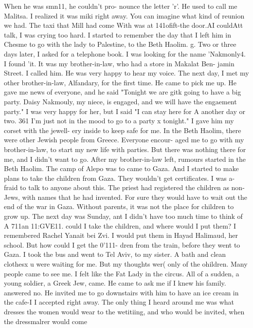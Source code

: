 When he was smn11, he couldn't pro-
nounce the letter 'r'.
He used to call me Malitsa.
I realized it was miki right away.
You can imagine what kind of reunion we had.
The taxi that Mill had come With was at 
141ofift-the 
door.AI couldAtt talk, I was crying too hard.
I started to remember the day that 
I left him in Chesme to go with the lady to Palestine, to the Beth Haolim.
g. 
Two or three days later, I asked for a telephone book.
I was looking for the name 
'Nakmonly4.
I found 'it.
It was my brother-in-law, who had a store in Makalat Ben-
jamin Street.
I called him.
He was very happy to hear my voice.
The next day, I met 
my other brother-in-law, Alfandary, for the first time.
He came to pick me up.
He 
gave me news of everyone, and he said "Tonight we are gitk going to have a big party.
Daisy Nakmouly, my niece, is engaged, and we will have the engaement party."
I was 
very happy for her, but I said "I can stay here for A another day or two.
361 I'm 
just not in the mood to go to a party x tonight."
I gave him my corset with the jewell-
ery inside to keep safe for me.
In the Beth Haolim, there were other Jewish people from Greece.
Everyone encour-
aged me to go with my brother-in-law, to start my new life with parties.
But there was 
nothing there for me, and I didn't want to go.
After my brother-in-law left, rumours 
started in the Beth Haolim.
The camp of Alepo was to came to Gaza.
And I started to 
make plans to take the children from Gaza.
They wouldn't get certificates.
I was a-
fraid to talk to anyone about this.
The priest had registered the children as non-Jews, 
with names that he had invented.
For sure they would have to wait out the end of the 
war in Gaza.
Without parents, it was not the place for children to grow up.
The next day was Sunday, ant I didn't have too much time to think of A 711an 11:GVE11.
could I take the children, and where would I put them?
I remembered Rachel Yanait bei 
Zvi.
I would put them in Hayad Halimaud, her school.
But how could I get the 0'111- 
dren from the train, before they went to Gaza.
I took the bus and went to Tel Aviv, 
to my sister.
A bath and clean clothesx u were waiting for me.
But my thoughts wer( 
only of the ohildren.
Many people came to see me.
I felt like the Fat Lady in the circus.
All of a 
sudden, a young soldier, a Greek Jew, came.
He came to ask me if I knew his family.
answered no.
He invited me to go downstairs with him to have an ice cream in the cafe-I 
I accepted right away.
The only thing I heard around me was what dresses the women 
would wear to the wetitiing, and who would be invited, when the dressmalrer would come 
